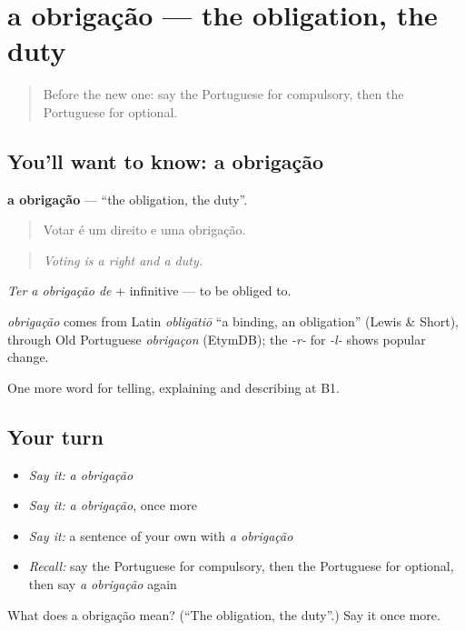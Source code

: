 \section[a obrigação]{a obrigação — the obligation, the duty}

\label{lesson:PT-C381-obrigacao}



\begin{quote}
Before the new one: say the Portuguese for compulsory, then the Portuguese for optional.
\end{quote}

\subsection*{You'll want to know: a obrigação}
\textbf{a obrigação} — \textquotedblleft{}the obligation, the duty\textquotedblright{}.

\begin{quote}
Votar é um direito e uma obrigação.
\end{quote}

\begin{quote}
\emph{Voting is a right and a duty.}
\end{quote}

\emph{Ter a obrigação de} + infinitive — to be obliged to.

\begin{cousinweb}
\emph{obrigação} comes from Latin \emph{obligātiō} \textquotedblleft{}a binding, an obligation\textquotedblright{} (Lewis \& Short), through Old Portuguese \emph{obrigaçon} (EtymDB); the \emph{-r-} for \emph{-l-} shows popular change.
\end{cousinweb}

\begin{grammarlens}[title={What you've built}]
One more word for telling, explaining and describing at B1.
\end{grammarlens}

\subsection*{Your turn}
\begin{itemize}
\raggedright
  \item \emph{Say it:} \emph{a obrigação}
  \item \emph{Say it:} \emph{a obrigação}, once more
  \item \emph{Say it:} a sentence of your own with \emph{a obrigação}
  \item \emph{Recall:} say the Portuguese for compulsory, then the Portuguese for optional, then say \emph{a obrigação} again
\end{itemize}

\begin{tcolorbox}[breakable,colback=teal!4,colframe=teal!35!black,title={Before you move on}]
What does a obrigação mean? (\textquotedblleft{}The obligation, the duty\textquotedblright{}.) Say it once more.
\end{tcolorbox}
